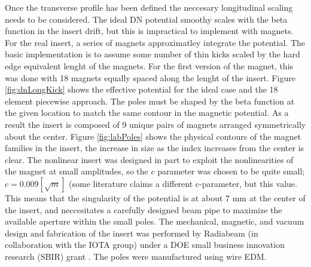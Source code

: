 Once the transverse profile has been defined the neccesary longitudinal scaling needs to be considered. The ideal DN potential smoothy scales with the beta function in the insert drift, but this is impractical to implement with magnets. For the real insert, a series of magnets approximatley integrate the potential. The basic implementation is to assume some number of thin kicks scaled by the hard edge equivalent lenght of the magnets. For the first version of the magnet, this was done with 18 magnets equally spaced along the lenght of the insert. Figure \ref{fig:dnLongKick} shows the effective potential for the ideal case and the 18 element piecewise approach. The poles must be shaped by the beta function at the given location to match the same contour in the magnetic potential. As a result the insert is composed of 9 unique pairs of magnets arranged symmetrically about the center. Figure \ref{fig:labPoles} shows the physical contours of the magnet families in the insert, the increase in size as the index increases from the center is clear. The nonlinear insert was designed in part to exploit the nonlinearities of the magnet at small amplitudes, so the $c$ parameter was chosen to be quite small; $c=0.009 [\sqrt{m}]$ (some literature claims a different c-parameter, but this value. This means that the singularity of the potential is at about 7 mm at the center of the insert, and neccesitates a carefully designed beam pipe to maximize the available aperture within the small poles. The mechanical, magnetic, and vacuum design and fabrication of the insert was performed by Radiabeam (in collaboration with the IOTA group) under a DOE small business innovation research (SBIR) grant \cite{radiabeamInsertReports}. The poles were manufactured using wire EDM.  


